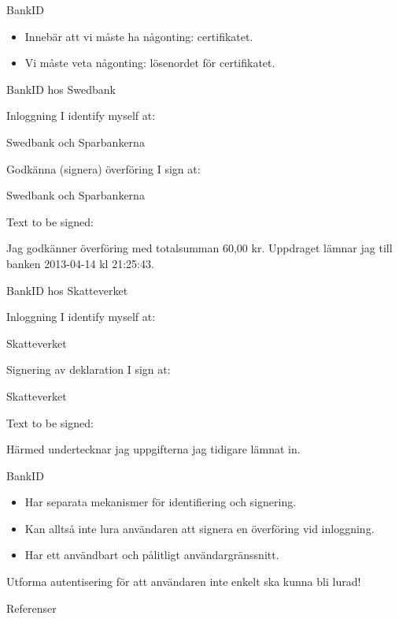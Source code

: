 \documentclass{beamer}
\begin{document}
\begin{frame}{\insertsubsectionhead}{BankID}
  \begin{itemize}
    \item Innebär att vi måste ha någonting: certifikatet.
    \item Vi måste veta någonting: lösenordet för certifikatet.
  \end{itemize}
\end{frame}

\begin{frame}{\insertsubsectionhead}{BankID hos Swedbank}
  \begin{block}{Inloggning}
    I identify myself at:
    
    Swedbank och Sparbankerna
  \end{block}
  \begin{block}{Godkänna (signera) överföring}
    I sign at:
    
    Swedbank och Sparbankerna

    \vspace{1em}
    Text to be signed:

    Jag godkänner överföring med totalsumman 60,00 kr.
    Uppdraget lämnar jag till banken 2013-04-14 kl 21:25:43.
  \end{block}
\end{frame}

\begin{frame}{\insertsubsectionhead}{BankID hos Skatteverket}
  \begin{block}{Inloggning}
    I identify myself at:
    
    Skatteverket
  \end{block}
  \begin{block}{Signering av deklaration}
    I sign at:

    Skatteverket

    \vspace{1em}
    Text to be signed:

    Härmed undertecknar jag uppgifterna jag tidigare lämnat in.
  \end{block}
\end{frame}

\begin{frame}{\insertsubsectionhead}{BankID}
  \begin{itemize}
    \item Har separata mekanismer för identifiering och signering.
    \item Kan alltså inte lura användaren att signera en överföring vid 
      inloggning.
    \item Har ett användbart och pålitligt användargränssnitt.
  \end{itemize}
\end{frame}


\begin{frame}{\insertsubsectionhead}
  Utforma autentisering för att användaren inte enkelt ska kunna bli lurad!
\end{frame}



\begin{frame}[allowframebreaks]{Referenser}
	\small
  \printbibliography{}
\end{frame}
\end{document}
